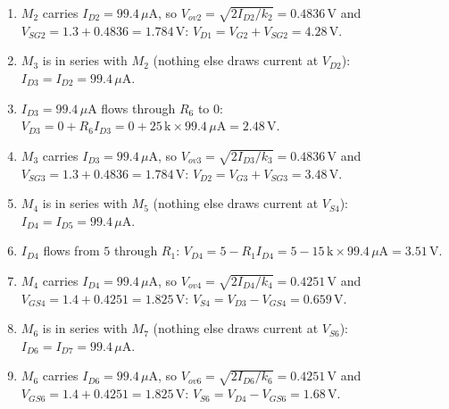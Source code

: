 \documentclass[11pt]{article}
\begin{document}
\begin{enumerate}[leftmargin=*,itemsep=3pt]
\item $M_{2}$ carries $I_{D2} = 99.4\,\mu \mathrm{A}$, so $V_{ov2} = \sqrt{2I_{D2}/k_{2}} = 0.4836$\,V and $V_{SG2} = 1.3 + 0.4836 = 1.784$\,V: $V_{D1} = V_{G2} + V_{SG2} = 4.28\,\mathrm{V}$.
\item $M_{3}$ is in series with $M_{2}$ (nothing else draws current at $V_{D2}$): $I_{D3} = I_{D2} = 99.4\,\mu \mathrm{A}$.
\item $I_{D3} = 99.4\,\mu \mathrm{A}$ flows through $R_{6}$ to $0$: $V_{D3} = 0 + R_{6}I_{D3} = 0 + 25\,\mathrm{k}\times99.4\,\mu \mathrm{A} = 2.48\,\mathrm{V}$.
\item $M_{3}$ carries $I_{D3} = 99.4\,\mu \mathrm{A}$, so $V_{ov3} = \sqrt{2I_{D3}/k_{3}} = 0.4836$\,V and $V_{SG3} = 1.3 + 0.4836 = 1.784$\,V: $V_{D2} = V_{G3} + V_{SG3} = 3.48\,\mathrm{V}$.
\item $M_{4}$ is in series with $M_{5}$ (nothing else draws current at $V_{S4}$): $I_{D4} = I_{D5} = 99.4\,\mu \mathrm{A}$.
\item $I_{D4}$ flows from $5$ through $R_{1}$: $V_{D4} = 5 - R_{1}I_{D4} = 5 - 15\,\mathrm{k}\times99.4\,\mu \mathrm{A} = 3.51\,\mathrm{V}$.
\item $M_{4}$ carries $I_{D4} = 99.4\,\mu \mathrm{A}$, so $V_{ov4} = \sqrt{2I_{D4}/k_{4}} = 0.4251$\,V and $V_{GS4} = 1.4 + 0.4251 = 1.825$\,V: $V_{S4} = V_{D3} - V_{GS4} = 0.659\,\mathrm{V}$.
\item $M_{6}$ is in series with $M_{7}$ (nothing else draws current at $V_{S6}$): $I_{D6} = I_{D7} = 99.4\,\mu \mathrm{A}$.
\item $M_{6}$ carries $I_{D6} = 99.4\,\mu \mathrm{A}$, so $V_{ov6} = \sqrt{2I_{D6}/k_{6}} = 0.4251$\,V and $V_{GS6} = 1.4 + 0.4251 = 1.825$\,V: $V_{S6} = V_{D4} - V_{GS6} = 1.68\,\mathrm{V}$.
\end{enumerate}
\end{document}
